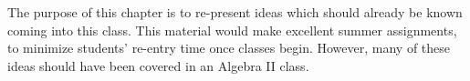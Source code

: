 


The purpose of this chapter is to re-present ideas which should already be known coming into
this class.  This material would make excellent summer assignments, to minimize students' 
re-entry time once classes begin.  However, many of these ideas should have been covered in
an Algebra II class.

\newpage
\chapterminitoc


\newpage

\newpage

\newpage

\newpage

\newpage

\newpage

\newpage

